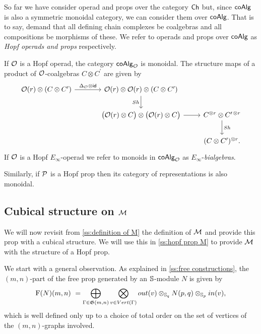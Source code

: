 So far we have consider operad and props over the category $\Ch$ but, since $\coAlg$ is also a symmetric monoidal category, we can consider them over $\coAlg$.
That is to say, demand that all defining chain complexes be coalgebras and all compositions be morphisms of these.
We refer to operads and props over $\coAlg$ as \textit{Hopf operads and props} respectively.

If $\cO$ is a Hopf operad, the category $\coAlg_\cO$ is monoidal.
The structure maps of a product of $\cO$-coalgebras $C \otimes C^\prime$ are given by
\[
\begin{tikzcd} [column sep = normal, row sep=normal]
\cO(r) \otimes (C \otimes C^\prime) \arrow[r, "\Delta_\cO \otimes \id"] &[10 pt] \cO(r) \otimes \cO(r) \otimes (C \otimes C^\prime) \arrow[d, "Sh"'] &[-0pt] \\ &
\big(\cO(r) \otimes C \big) \otimes \big( \cO(r) \otimes C \big) \arrow[r] &
C^{\otimes r} \otimes C^{\prime\, \otimes r} \arrow[d, "Sh"] \\
& & (C \otimes C^\prime)^{\otimes r}.
\end{tikzcd}
\]
If $\cO$ is a Hopf $E_\infty$-operad we refer to monoids in $\coAlg_\cO$ as $E_\infty$-\textit{bialgebras}.

Similarly, if $\cP$ is a Hopf prop then its category of representations is also monoidal.

\subsection{Cubical structure on $\M$}

We will now revisit from \cref{ss:definition of M} the definition of $\M$ and provide this prop with a cubical structure.
We will use this in \cref{ss:hopf prop M} to provide $\M$ with the structure of a Hopf prop.

We start with a general observation.
As explained in \cref{ss:free constructions}, the $(m,n)$-part of the free prop generated by an $\S$-module $N$ is given by
\[
\free(N)(m,n) \ = \bigoplus_{\Gamma \in \graphs(m,n)} \bigotimes_{v \in Vert(\Gamma)} out(v) \otimes_{\S_q} N(p, q) \otimes_{\S_p} in(v),
\]
which is well defined only up to a choice of total order on the set of vertices of the $(m,n)$-graphs involved.

